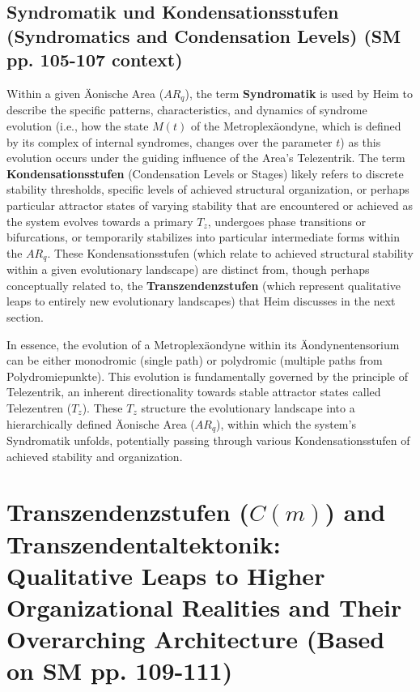 \documentclass[
    12pt,              %
    a4paper,           %
    headings=normal,   %
    twoside=true,      %
    BCOR=8mm,          %
]{scrbook}
\newcommand{\metroplexaeondyne}{\text{Metroplexäondyne}}
\newcommand{\telezentrum}{T_z}
\newcommand{\aeonischearea}{AR_q}
\newcommand{\transzendenzstufe}[1]{C(#1)}
\begin{document}
\subsection{Syndromatik und Kondensationsstufen (Syndromatics and Condensation Levels) (SM pp. 105-107 context)}
\label{sec:ch6_syndromatik_kondensation}
Within a given Äonische Area (\(\aeonischearea\)), the term \textbf{Syndromatik} is used by Heim to describe the specific patterns, characteristics, and dynamics of syndrome evolution (i.e., how the state \(M(t)\) of the \(\metroplexaeondyne\), which is defined by its complex of internal syndromes, changes over the parameter \(t\)) as this evolution occurs under the guiding influence of the Area’s Telezentrik. The term \textbf{Kondensationsstufen} (Condensation Levels or Stages) likely refers to discrete stability thresholds, specific levels of achieved structural organization, or perhaps particular attractor states of varying stability that are encountered or achieved as the system evolves towards a primary \(\telezentrum\), undergoes phase transitions or bifurcations, or temporarily stabilizes into particular intermediate forms within the \(\aeonischearea\). These Kondensationsstufen (which relate to achieved structural stability within a given evolutionary landscape) are distinct from, though perhaps conceptually related to, the \textbf{Transzendenzstufen} (which represent qualitative leaps to entirely new evolutionary landscapes) that Heim discusses in the next section.

In essence, the evolution of a \(\metroplexaeondyne\) within its Äondynentensorium can be either monodromic (single path) or polydromic (multiple paths from Polydromiepunkte). This evolution is fundamentally governed by the principle of Telezentrik, an inherent directionality towards stable attractor states called Telezentren (\(\telezentrum\)). These \(\telezentrum\) structure the evolutionary landscape into a hierarchically defined Äonische Area (\(\aeonischearea\)), within which the system’s Syndromatik unfolds, potentially passing through various Kondensationsstufen of achieved stability and organization.

\section{Transzendenzstufen (\(\transzendenzstufe{m}\)) and Transzendentaltektonik: Qualitative Leaps to Higher Organizational Realities and Their Overarching Architecture (Based on SM pp. 109-111)}
\label{sec:ch6_transzendenz}
\end{document}
